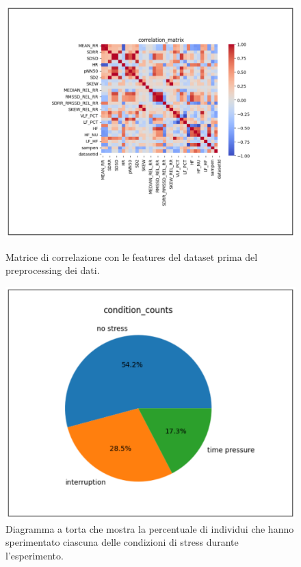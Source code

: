 \begin{figure}[t]
    \begin{multicols}{2}
        \centering
        \includegraphics[width=\linewidth]{img//6/1.png}
        \caption{Matrice di correlazione con le features del dataset prima del preprocessing dei dati.}
        \label{fig:6-1}
        
        \columnbreak
        
        \includegraphics[width=\linewidth]{img//6/2.png}
        \caption{Diagramma a torta che mostra la percentuale di individui che hanno sperimentato ciascuna delle condizioni di stress durante l'esperimento.}
        \label{fig:6-2}
    \end{multicols}
\end{figure}

